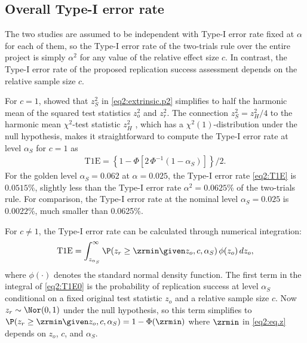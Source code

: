 \subsection{Overall Type-I error rate}\label{sec2:T1E}
The two studies are assumed to be independent with Type-I error rate fixed at
$\alpha$ for each of them, so the Type-I error rate of the two-trials rule over
the entire project is simply $\alpha^2$ for any value of the relative effect
size $c$. In contrast, the Type-I error rate of the proposed replication success
assessment {depends on} the relative sample size $c$.

For $c=1$, \citet[Section 3]{Held2020} showed that $z_S^2$ in
\eqref{eq2:extrinsic.p2} simplifies to half the harmonic mean of the squared test
statistics $z_o^2$ and $z_r^2$. The connection $z_S^2 = z_H^2/4$ to the harmonic
mean $\chi^2$-test statistic $z_H^2$ \citep{Held2020b}, which has a
$\chi^2(1)$-distribution under the null hypothesis, makes it straightforward to
compute the Type-I error rate at level $\alpha_S$ for $c = 1$ as
\begin{eqnarray}\label{eq2:T1E}
\mbox{T1E} =   \left\{1-\Phi\left[2 \, \Phi^{-1}\left(1-\alpha_S \right)
 \right]\right\}/2.
\end{eqnarray}
For the golden level $\alpha_S =0.062$ at $\alpha = 0.025$, the Type-I error
rate \eqref{eq2:T1E} is $0.0515$\%, slightly less than the Type-I error rate
$\alpha^2=0.0625$\% of the two-trials rule. For comparison, the Type-I error
rate at the nominal level $\alpha_S=0.025$ is $0.0022$\%, much smaller than
0.0625\%.


For $c \neq 1$, the Type-I error rate can be calculated through numerical
integration:
\begin{equation}\label{eq2:T1E0}
  \mbox{T1E} = \int_{z_{\alpha_S}}^{\infty}
\P(z_r \geq \zrmin \given z_o, c, \alpha_S) \,
  \phi(z_o) \, dz_o,
\end{equation}
where $\phi(\cdot)$ denotes the standard normal density function. The first term
in the integral of \eqref{eq2:T1E0} is the probability of replication success at
level $\alpha_S$ conditional on a fixed original test statistic $z_o$ and a
relative sample size $c$. Now $z_r \sim \Nor(0,1)$ under the null hypothesis, so
this term simplifies to
$\P(z_r \geq \zrmin \given z_o, c, \alpha_S) = 1 - \Phi(\zrmin)$ where $\zrmin$
in \eqref{eq2:eq.z} depends on $z_o$, $c$, and $\alpha_S$.



